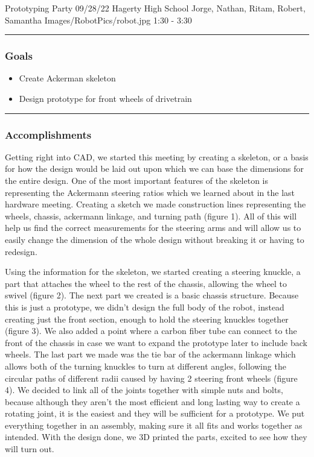 \insertmeeting 
	{Prototyping Party} 
	{09/28/22} 
	{Hagerty High School}
	{Jorge, Nathan, Ritam, Robert, Samantha}
	{Images/RobotPics/robot.jpg}
	{1:30 - 3:30}
	
\noindent\hfil\rule{\textwidth}{.4pt}\hfil
\subsubsection*{Goals}
\begin{itemize}
    \item Create Ackerman skeleton
    \item Design prototype for front wheels of drivetrain


\end{itemize} 

\noindent\hfil\rule{\textwidth}{.4pt}\hfil

\subsubsection*{Accomplishments}
Getting right into CAD, we started this meeting by creating a skeleton, or a basis for how the design would be laid out upon which we can base the dimensions for the entire design. One of the most important features of the skeleton is representing the Ackermann steering ratios which we learned about in the last hardware meeting. Creating a sketch we made construction lines representing the wheels, chassis, ackermann linkage, and turning path (figure 1). All of this will help us find the correct measurements for the steering arms and will allow us to easily change the dimension of the whole design without breaking it or having to redesign.

Using the information for the skeleton, we started creating a steering knuckle, a part that attaches the wheel to the rest of the chassis, allowing the wheel to swivel (figure 2). The next part we created is a basic chassis structure. Because this is just a prototype, we didn’t design the full body of the robot, instead creating just the front section, enough to hold the steering knuckles together (figure 3). We also added a point where a carbon fiber tube can connect to the front of the chassis in case we want to expand the prototype later to include back wheels. The last part we made was the tie bar of the ackermann linkage which allows both of the turning knuckles to turn at different angles, following the circular paths of different radii caused by having 2 steering front wheels (figure 4). We decided to link all of the joints together with simple nuts and bolts, because although they aren't the most efficient and long lasting way to create a rotating joint, it is the easiest and they will be sufficient for a prototype. We put everything together in an assembly, making sure it all fits and works together as intended. With the design done, we 3D printed the parts, excited to see how they will turn out.

